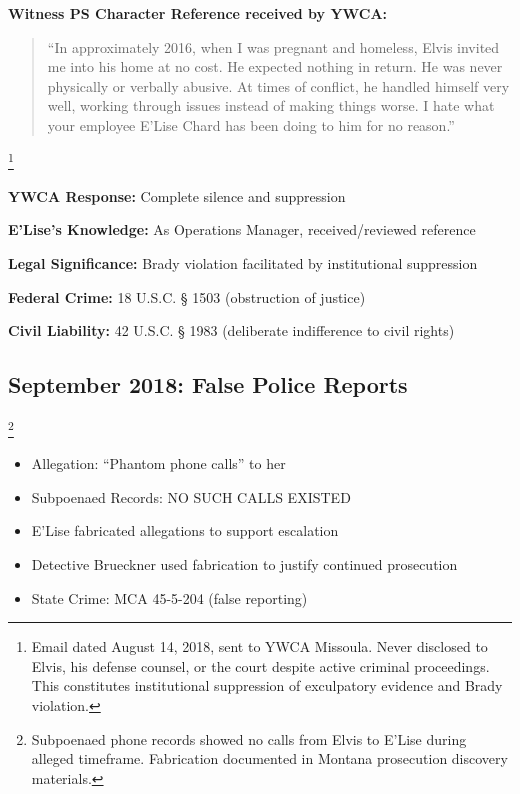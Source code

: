 \documentclass[12pt,oneside]{article}
\begin{document}
\textbf{Witness PS Character Reference received by YWCA:}

\begin{quote}

``In approximately 2016, when I was pregnant and homeless, Elvis invited me into his home at no cost. He expected nothing in return. He was never physically or verbally abusive. At times of conflict, he handled himself very well, working through issues instead of making things worse. I hate what your employee E'Lise Chard has been doing to him for no reason.''

\end{quote}\footnote{Email dated August 14, 2018, sent to YWCA Missoula. Never disclosed to Elvis, his defense counsel, or the court despite active criminal proceedings. This constitutes institutional suppression of exculpatory evidence and Brady violation.}

\textbf{YWCA Response:} Complete silence and suppression

\textbf{E'Lise's Knowledge:} As Operations Manager, received/reviewed reference

\textbf{Legal Significance:} Brady violation facilitated by institutional suppression

\textbf{Federal Crime:} 18 U.S.C. § 1503 (obstruction of justice)

\textbf{Civil Liability:} 42 U.S.C. § 1983 (deliberate indifference to civil rights)

\subsection*{September 2018: False Police Reports}\footnote{Subpoenaed phone records showed no calls from Elvis to E'Lise during alleged timeframe. Fabrication documented in Montana prosecution discovery materials.}

\begin{itemize}

\item Allegation: ``Phantom phone calls'' to her

\item Subpoenaed Records: NO SUCH CALLS EXISTED

\item E'Lise fabricated allegations to support escalation

\item Detective Brueckner used fabrication to justify continued prosecution

\item State Crime: MCA 45-5-204 (false reporting)

\end{itemize}
\end{document}
